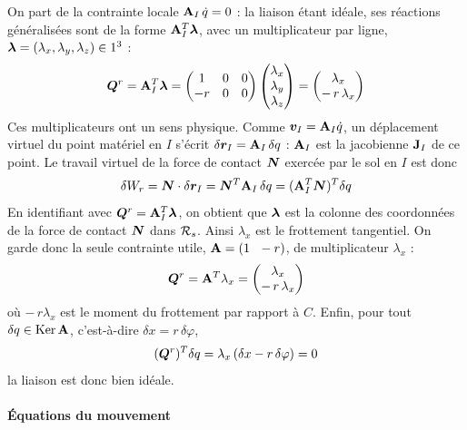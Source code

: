 On part de la contrainte locale $\mathbf{A}_I\,\dot q = 0$ : la liaison
étant idéale, ses réactions généralisées sont de la forme
$\mathbf{A}_I^T\bm{\lambda}$, avec un multiplicateur par ligne,
$\bm{\lambda} = (\lambda_x,\lambda_y,\lambda_z)\in1^3$ :
\[
    \bm{Q}^r = \mathbf{A}_I^T\bm{\lambda}
    = \begin{pmatrix}
        1 & 0 & 0\\ -r & 0 & 0
    \end{pmatrix}
    \begin{pmatrix} \lambda_x\\ \lambda_y\\ \lambda_z \end{pmatrix}
    = \begin{pmatrix} \lambda_x\\ -\,r\,\lambda_x \end{pmatrix}
\]
Ces multiplicateurs ont un sens physique. Comme
$\bm{v}_I = \mathbf{A}_I\dot q$, un déplacement virtuel du point
matériel en $I$ s'écrit $\delta\bm{r}_I = \mathbf{A}_I\,\delta q$ :
$\mathbf{A}_I$ est la jacobienne $\mathbf{J}_I$ de ce point. Le travail
virtuel de la force de contact $\bm{N}$ exercée par le sol en $I$ est
donc
\[
    \delta W_r = \bm{N}\cdot\delta\bm{r}_I
    = \bm{N}^T\mathbf{A}_I\,\delta q
    = (\mathbf{A}_I^T\bm{N})^T\delta q
\]
En identifiant avec $\bm{Q}^r = \mathbf{A}_I^T\bm{\lambda}$, on obtient
que $\bm{\lambda}$ est la colonne des coordonnées de la force de contact
$\bm{N}$ dans $\mathcal{R}_{s}$. Ainsi $\lambda_x$ est le frottement
tangentiel. On garde donc la seule contrainte utile, $\mathbf{A} = (1\ \ -r)$,
de multiplicateur $\lambda_x$ :
\[
    \bm{Q}^r = \mathbf{A}^T\lambda_x = \begin{pmatrix} \lambda_x\\ -\,r\,\lambda_x
    \end{pmatrix}
\]
où $-\,r\lambda_x$ est le moment du frottement par rapport à $C$. Enfin,
pour tout $\delta q\in\operatorname{Ker}\mathbf{A}$, c'est-à-dire
$\delta x = r\,\delta\varphi$,
\[
    (\bm{Q}^r)^T\delta q = \lambda_x\,(\delta x - r\,\delta\varphi) = 0
\]
la liaison est donc bien idéale.

\paragraph{Équations du mouvement}

